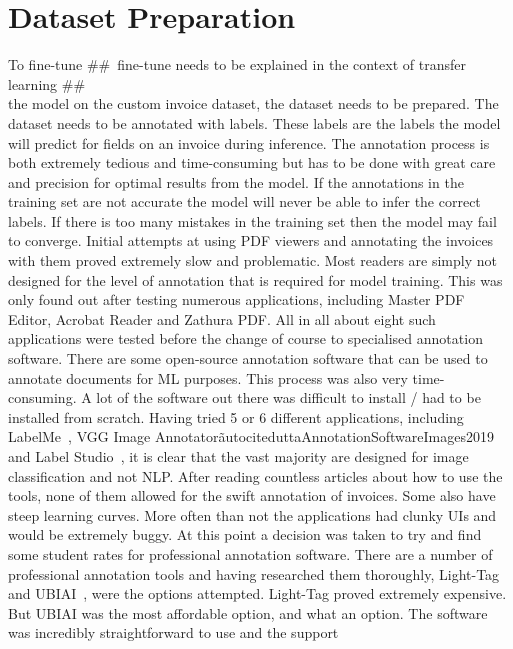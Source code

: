 \section{Dataset Preparation}
\label{sec:dataset}
To fine-tune \#\#\ fine-tune needs to be explained in the context of transfer learning \#\# \\
the model on the custom invoice dataset, the dataset needs to be prepared. The dataset needs to be annotated
with labels. These labels are the labels the model will predict for fields on an invoice during inference.
\bigbreak
The annotation process is both extremely tedious and time-consuming but has to be done with great care and precision
for optimal results from the model. If the annotations in the training set are not accurate the model will never be able
to infer the correct labels. If there is too many mistakes in the training set then the model may fail to converge.
\bigbreak
Initial attempts at using PDF viewers and annotating the invoices with them proved extremely slow and problematic.
Most readers are simply not designed for the level of annotation that is required for model training. This was only
found out after testing numerous applications, including Master PDF Editor, Acrobat Reader and Zathura PDF. All in
all about eight such applications were tested before the change of course to specialised annotation software.
\bigbreak
There are some open-source annotation software that can be used to annotate documents for ML purposes. This process was
also very time-consuming. A lot of the software out there was difficult to install / had to be installed from
scratch. Having tried 5 or 6 different applications, including LabelMe~\autocite{wadaLabelmeImagePolygonal2022},
VGG Image Annotator\~autocite{duttaAnnotationSoftwareImages2019} and Label Studio~\autocite{LabelStudioOpen}, it
is clear that the vast majority are designed for image classification and not NLP. After reading countless articles
about how to use the tools, none of them allowed for the swift annotation of invoices. Some also have steep learning
curves. More often than not the applications had clunky UIs and would be extremely buggy. At this point a decision
was taken to try and find some student rates for professional annotation software.
\bigbreak
There are a number of professional annotation tools and having researched them thoroughly, Light-Tag~\autocite{LightTagTextAnnotation}
and UBIAI~\autocite{EasyUseText}, were the options attempted. Light-Tag proved extremely expensive. But UBIAI was the
most affordable option, and what an option. The software was incredibly straightforward to use and the support
